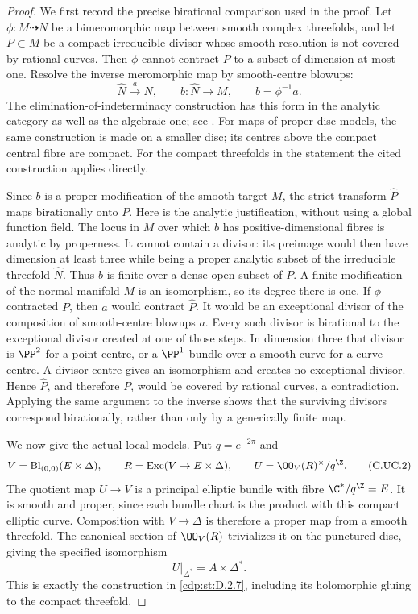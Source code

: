 \begin{proof}
We first record the precise birational comparison
used in the proof. Let $\phi:M\dashrightarrow N$
be a bimeromorphic map between smooth complex
threefolds, and let $P\subset M$ be a compact
irreducible divisor whose smooth resolution is
not covered by rational curves. Then $\phi$
cannot contract $P$ to a subset of dimension
at most one. Resolve the inverse meromorphic
map by smooth-centre blowups:
\[
 \widehat N\xrightarrow{\ a\ }N,
 \qquad b:\widehat N\longrightarrow M,
 \qquad b=\phi^{-1}a.
\tag{C.UC.1}\label{cdp:eq:C.UC.1}
\]
The elimination-of-indeterminacy construction
has this form in the analytic category as
well as the algebraic one; see
\cite[Section~1.2.4 and Lemma~1.3.1]{AKMW2002}.
For maps of proper disc models, the same
construction is made on a smaller disc; its
centres above the compact central fibre are
compact. For the compact threefolds in the
statement the cited construction applies
directly.

Since $b$ is a proper modification of the
smooth target $M$, the strict transform
$\widehat P$ maps birationally onto $P$.
Here is the analytic justification, without
using a global function field. The locus in
$M$ over which $b$ has positive-dimensional
fibres is analytic by properness. It cannot
contain a divisor: its preimage would then
have dimension at least three while being
a proper analytic subset of the irreducible
threefold $\widehat N$. Thus $b$ is finite
over a dense open subset of $P$. A finite
modification of the normal manifold $M$
is an isomorphism, so its degree there is
one. If $\phi$ contracted
$P$, then $a$ would contract $\widehat P$.
It would be an exceptional divisor of the
composition of smooth-centre blowups $a$.
Every such divisor is birational to the
exceptional divisor created at one of those
steps. In dimension three that divisor is
$\PP^2$ for a point centre, or a
$\PP^1$-bundle over a smooth curve for a
curve centre. A divisor centre gives an
isomorphism and creates no exceptional
divisor. Hence $\widehat P$, and therefore
$P$, would be covered by rational curves,
a contradiction. Applying the same argument
to the inverse shows that the surviving
divisors correspond birationally, rather
than only by a generically finite map.

We now give the actual local models. Put
$q=e^{-2\pi}$ and
\[
 V=\operatorname{Bl}_{(0,0)}(E\times\Delta),
 \qquad R=\operatorname{Exc}(V\to E\times\Delta),
 \qquad U=\OO_V(R)^\times/q^{\Z}.
\tag{C.UC.2}\label{cdp:eq:C.UC.2}
\]
The quotient map $U\to V$ is a principal
elliptic bundle with fibre $\C^*/q^{\Z}=E$.
It is smooth and proper, since each bundle
chart is the product with this compact
elliptic curve. Composition with $V\to\Delta$
is therefore a proper map from a smooth
threefold. The canonical section of
$\OO_V(R)$ trivializes it on the punctured
disc, giving the specified isomorphism
\[
                         U|_{\Delta^*}=A\times\Delta^*.
\tag{C.UC.3}\label{cdp:eq:C.UC.3}
\]
This is exactly the construction in \ref{cdp:st:D.2.7},
including its holomorphic gluing to the
compact threefold.


\end{proof}
